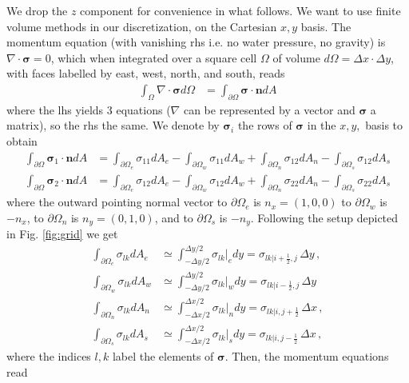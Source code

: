 \documentclass[11pt,a4paper]{article}
\newcommand{\p}{\partial}
\newcommand{\bb}[1]{\boldsymbol{#1}}
\begin{document}
We drop the $z$ component for convenience in what follows. We want to use finite volume methods in our discretization, on the Cartesian $x,y$ basis. The momentum equation (with vanishing rhs i.e. no water pressure, no gravity) is $\nabla \cdot \bb{\sigma} = 0$, which when integrated over a square cell $\Omega$ of volume $d\Omega = \Delta x \cdot \Delta y$, with faces labelled by east, west, north, and south, reads
\begin{align*}
    \int_\Omega \nabla \cdot \bb{\sigma} d\Omega 
    & = \int_{\p \Omega} \bb{\sigma} \cdot \bb{n} dA
\end{align*}
where the lhs yields 3 equations ($\nabla$ can be represented by a vector and $\bb{\sigma}$ a matrix), so the rhs the same. We denote by $\bb{\sigma}_i$ the rows of $\bb{\sigma}$ in the $x,y,$ basis to obtain
\begin{align*}
    \int_{\p \Omega} \bb{\sigma}_1 \cdot \bb{n} dA
    & = \int_{\p \Omega_e} \sigma_{11} dA_e
    - \int_{\p \Omega_w} \sigma_{11} dA_w
    + \int_{\p \Omega_n} \sigma_{12} dA_n
    - \int_{\p \Omega_s} \sigma_{12} dA_s
    \\
    \int_{\p \Omega} \bb{\sigma}_2 \cdot \bb{n} dA
    & = \int_{\p \Omega_e} \sigma_{12} dA_e
    - \int_{\p \Omega_w} \sigma_{12} dA_w
    + \int_{\p \Omega_n} \sigma_{22} dA_n
    - \int_{\p \Omega_s} \sigma_{22} dA_s
\end{align*}
where the outward pointing normal vector to $\p\Omega_e$ is $n_x = (1,0,0)$ to $\p\Omega_w$ is $-n_x$, to $\p\Omega_n$ is $n_y=(0,1,0)$, and to $\p\Omega_s$ is $-n_y$. Following the setup depicted in Fig. \ref{fig:grid} we get
\begin{align*}
    \int_{\p \Omega_e} \sigma_{lk} dA_e 
    &\simeq 
    \int_{-\Delta y/2}^{\Delta y/2} \sigma_{lk}|_e dy = \sigma_{lk| i+\frac{1}{2},j} \, \Delta y
    \,,
    \\
    \int_{\p \Omega_w} \sigma_{lk} dA_w 
    &\simeq 
    \int_{-\Delta y/2}^{\Delta y/2} \sigma_{lk}|_w dy = \sigma_{lk| i-\frac{1}{2},j} \, \Delta y
    \\
    \int_{\p \Omega_n} \sigma_{lk} dA_n 
    &\simeq 
    \int_{-\Delta x/2}^{\Delta x/2} \sigma_{lk}|_n dy = \sigma_{lk| i,j+\frac{1}{2}} \, \Delta x
    \,,
    \\
    \int_{\p \Omega_s} \sigma_{lk} dA_s 
    &\simeq 
    \int_{-\Delta x/2}^{\Delta x/2} \sigma_{lk}|_s dy = \sigma_{lk| i,j-\frac{1}{2}} \, \Delta x
    \,,
\end{align*}
where the indices $l,k$ label the elements of $\bb{\sigma}$. Then, the momentum equations read
\end{document}
